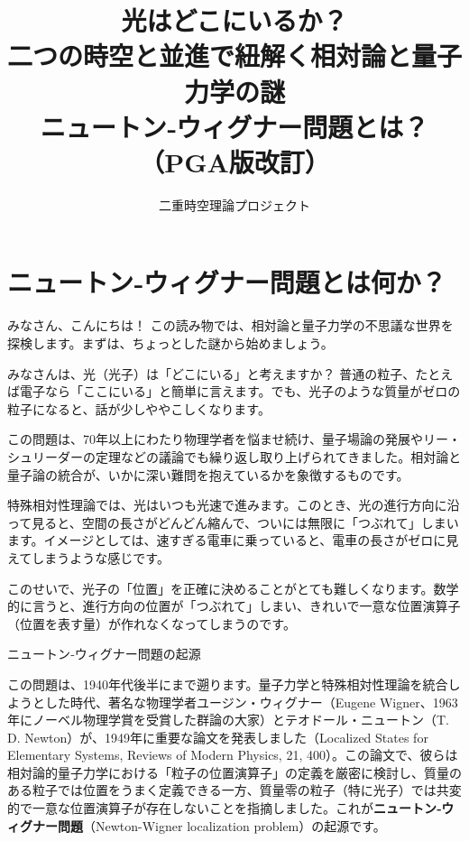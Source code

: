 \documentclass[dvipdfmx,a4paper,oneside]{jsbook}
\title{光はどこにいるか？ \\二つの時空と並進で紐解く相対論と量子力学の謎\\
ニュートン‐ウィグナー問題とは？（PGA版改訂）}
\author{二重時空理論プロジェクト}
\date{}
\begin{document}
\frontmatter
\maketitle
\tableofcontents

\mainmatter
\renewcommand{\sectionmark}[1]{\markboth{#1}{}}

\section{ニュートン‐ウィグナー問題とは何か？}

みなさん、こんにちは！ この読み物では、相対論と量子力学の不思議な世界を探検します。まずは、ちょっとした謎から始めましょう。

みなさんは、光（光子）は「どこにいる」と考えますか？ 普通の粒子、たとえば電子なら「ここにいる」と簡単に言えます。でも、光子のような質量がゼロの粒子になると、話が少しややこしくなります。

この問題は、70年以上にわたり物理学者を悩ませ続け、量子場論の発展やリー・シュリーダーの定理などの議論でも繰り返し取り上げられてきました。相対論と量子論の統合が、いかに深い難問を抱えているかを象徴するものです。

特殊相対性理論では、光はいつも光速で進みます。このとき、光の進行方向に沿って見ると、空間の長さがどんどん縮んで、ついには無限に「つぶれて」しまいます。イメージとしては、速すぎる電車に乗っていると、電車の長さがゼロに見えてしまうような感じです。

このせいで、光子の「位置」を正確に決めることがとても難しくなります。数学的に言うと、進行方向の位置が「つぶれて」しまい、きれいで一意な位置演算子（位置を表す量）が作れなくなってしまうのです。

\begin{itembox}[l]{ニュートン‐ウィグナー問題の起源}

この問題は、1940年代後半にまで遡ります。量子力学と特殊相対性理論を統合しようとした時代、著名な物理学者ユージン・ウィグナー（Eugene Wigner、1963年にノーベル物理学賞を受賞した群論の大家）とテオドール・ニュートン（T. D. Newton）が、1949年に重要な論文を発表しました（Localized States for Elementary Systems, Reviews of Modern Physics, 21, 400）。この論文で、彼らは相対論的量子力学における「粒子の位置演算子」の定義を厳密に検討し、質量のある粒子では位置をうまく定義できる一方、質量零の粒子（特に光子）では共変的で一意な位置演算子が存在しないことを指摘しました。これが\textbf{ニュートン‐ウィグナー問題}（Newton-Wigner localization problem）の起源です。

\end{itembox}
\end{document}
